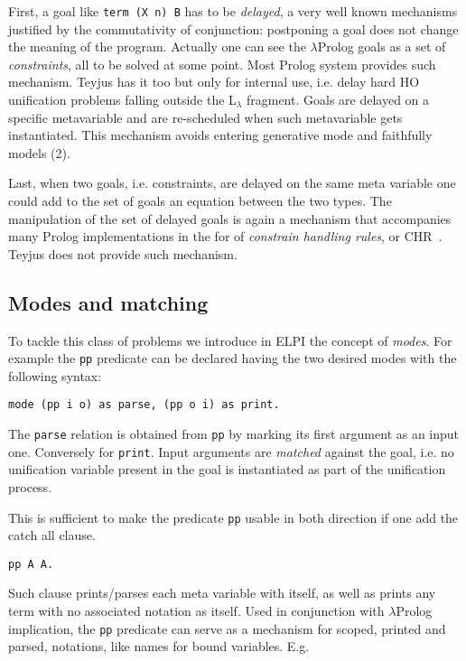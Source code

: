 \documentclass[preprint]{sigplanconf}
\begin{document}
First, a goal like \verb+term (X n) B+ has to be
\emph{delayed}, a very well known mechanisms justified by the commutativity of
conjunction: postponing a goal does not change the meaning of the program.
Actually one can see the $\lambda$Prolog goals as a set of \emph{constraints},
all to be solved at some point.  Most Prolog system provides such mechanism.
Teyjus has it too but only for internal use, i.e. delay hard HO unification
problems falling outside the L$_\lambda$ fragment.  Goals are delayed on
a specific metavariable and are re-scheduled when such metavariable
gets instantiated.  This mechanism avoids entering generative mode and
faithfully models (2).

Last, when two goals, i.e. constraints, are delayed on the same meta variable
one could add to the set of goals an equation between the two types.  The
manipulation of the set of delayed goals is again a mechanism that accompanies
many Prolog implementations in the for of \emph{constrain handling rules},
or CHR~\cite{CHR}.  Teyjus does not provide such mechanism.

\subsection{Modes and matching}

To tackle this class of problems we introduce in ELPI the concept of
\emph{modes}.  For example the \verb+pp+ predicate can be declared
having the two desired modes with the following syntax:

{\small
\begin{verbatim}
mode (pp i o) as parse, (pp o i) as print.
\end{verbatim}
}

The \verb+parse+ relation is obtained from \verb+pp+ by
marking its first argument as an input one.  Conversely for
\verb+print+.  Input arguments are \emph{matched} against
the goal, i.e. no unification variable present in the
goal is instantiated as part of the unification process.

This is sufficient to make the predicate \verb+pp+ usable
in both direction if one add the catch all clause.

{\small
\begin{verbatim}
pp A A.
\end{verbatim}
}

Such clause prints/parses each meta variable with itself,
as well as prints any term with no associated notation as
itself.  Used in conjunction with $\lambda$Prolog implication,
the \verb+pp+ predicate can serve as a mechanism for scoped, printed and
parsed, notations, like names for bound variables.  E.g.
\end{document}
